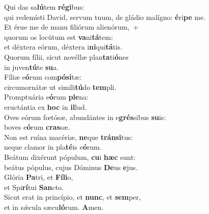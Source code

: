 \evenverse Qui das sa\textbf{lú}tem \textbf{ré}\textbf{gi}bus:~\*\\
\evenverse qui redemísti David, servum tuum, de gládio malígno: \textbf{é}ri\textbf{pe} me.\\
\oddverse Et érue me de manu filiórum alienórum,~+\\
\oddverse  quorum os locútum est \textbf{va}ni\textbf{tá}tem:~\*\\
\oddverse et déxtera eórum, déxtera i\textbf{ni}qui\textbf{tá}tis.\\
\evenverse Quorum fílii, sicut novéllæ plan\textbf{ta}ti\textbf{ó}nes~\*\\
\evenverse in juven\textbf{tú}te \textbf{su}a.\\
\oddverse Fíliæ e\textbf{ó}rum com\textbf{pó}\textbf{si}tæ:~\*\\
\oddverse circumornátæ ut simili\textbf{tú}do \textbf{tem}pli.\\
\evenverse Promptuária e\textbf{ó}rum \textbf{ple}na:~\*\\
\evenverse eructántia ex \textbf{hoc} in \textbf{il}lud.\\
\oddverse Oves eórum fœtósæ, abundántes in e\textbf{grés}sibus \textbf{su}is:~\*\\
\oddverse boves e\textbf{ó}rum \textbf{cras}sæ.\\
\evenverse Non est ruína macériæ, \textbf{ne}que \textbf{trán}\textbf{si}tus:~\*\\
\evenverse neque clamor in pla\textbf{té}is e\textbf{ó}rum.\\
\oddverse Beátum dixérunt pópulum, \textbf{cu}i \textbf{hæc} sunt:~\*\\
\oddverse beátus pópulus, cujus Dóminus \textbf{De}us \textbf{e}jus.\\
\evenverse Glória \textbf{Pa}tri, et \textbf{Fí}\textbf{li}o,~\*\\
\evenverse et Spi\textbf{rí}tui \textbf{San}cto.\\
\oddverse Sicut erat in princípio, et \textbf{nunc}, et \textbf{sem}per,~\*\\
\oddverse et in sǽcula sæcu\textbf{ló}rum. \textbf{A}men.\\
